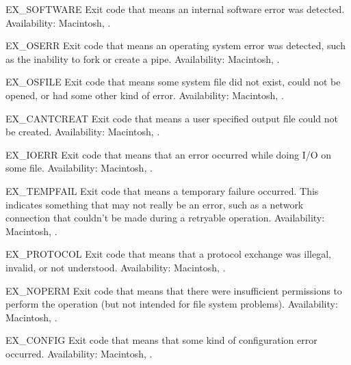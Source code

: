 \begin{datadesc}{EX_SOFTWARE}
Exit code that means an internal software error was detected.
Availability: Macintosh, \UNIX.
\end{datadesc}

\begin{datadesc}{EX_OSERR}
Exit code that means an operating system error was detected, such as
the inability to fork or create a pipe.
Availability: Macintosh, \UNIX.
\end{datadesc}

\begin{datadesc}{EX_OSFILE}
Exit code that means some system file did not exist, could not be
opened, or had some other kind of error.
Availability: Macintosh, \UNIX.
\end{datadesc}

\begin{datadesc}{EX_CANTCREAT}
Exit code that means a user specified output file could not be created.
Availability: Macintosh, \UNIX.
\end{datadesc}

\begin{datadesc}{EX_IOERR}
Exit code that means that an error occurred while doing I/O on some file.
Availability: Macintosh, \UNIX.
\end{datadesc}

\begin{datadesc}{EX_TEMPFAIL}
Exit code that means a temporary failure occurred.  This indicates
something that may not really be an error, such as a network
connection that couldn't be made during a retryable operation.
Availability: Macintosh, \UNIX.
\end{datadesc}

\begin{datadesc}{EX_PROTOCOL}
Exit code that means that a protocol exchange was illegal, invalid, or
not understood.
Availability: Macintosh, \UNIX.
\end{datadesc}

\begin{datadesc}{EX_NOPERM}
Exit code that means that there were insufficient permissions to
perform the operation (but not intended for file system problems).
Availability: Macintosh, \UNIX.
\end{datadesc}

\begin{datadesc}{EX_CONFIG}
Exit code that means that some kind of configuration error occurred.
Availability: Macintosh, \UNIX.
\end{datadesc}

